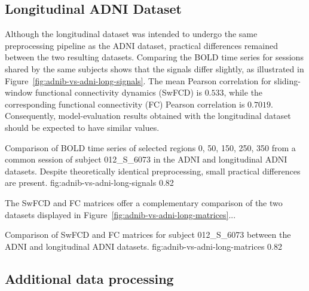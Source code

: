 \subsection{Longitudinal ADNI Dataset}
Although the longitudinal dataset was intended to undergo the same preprocessing
pipeline as the ADNI dataset, practical differences remained between the two
resulting datasets. Comparing the BOLD time series for sessions shared by the
same subjects shows that the signals differ slightly, as illustrated in
Figure~\ref{fig:adnib-vs-adni-long-signals}. The mean Pearson correlation for
sliding-window functional connectivity dynamics (SwFCD) is $0.533$, while the
corresponding functional connectivity (FC) Pearson correlation is $0.7019$.
Consequently, model-evaluation results obtained with the longitudinal dataset
should be expected to have similar values.

{Comparison of BOLD time series of selected regions 0, 50, 150, 250, 350 from a common session of subject 012\_S\_6073 in the ADNI and longitudinal ADNI datasets. Despite theoretically identical preprocessing, small practical differences are present.}
{fig:adnib-vs-adni-long-signals}
{0.82\textwidth}

The SwFCD and FC matrices offer a complementary comparison of the two datasets displayed in Figure~\ref{fig:adnib-vs-adni-long-matrices}... 

{Comparison of SwFCD and FC matrices for subject 012\_S\_6073 between the ADNI and longitudinal ADNI datasets.}
{fig:adnib-vs-adni-long-matrices}
{0.82\textwidth}


\subsection{Additional data processing}

